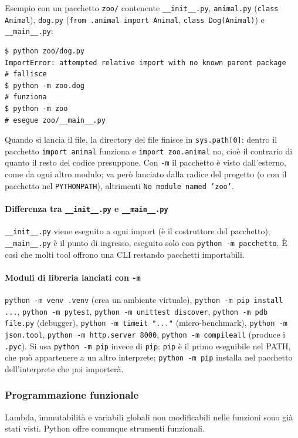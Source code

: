 \documentclass[a4paper,12pt]{article}
\begin{document}
Esempio con un pacchetto \texttt{zoo/} contenente \texttt{\_\_init\_\_.py}, \texttt{animal.py}
(\texttt{class Animal}), \texttt{dog.py} (\texttt{from .animal import Animal}, \texttt{class Dog(Animal)})
e \texttt{\_\_main\_\_.py}:
\begin{verbatim}
$ python zoo/dog.py
ImportError: attempted relative import with no known parent package   # fallisce
$ python -m zoo.dog                                                   # funziona
$ python -m zoo                                                       # esegue zoo/__main__.py
\end{verbatim}
Quando si lancia il file, la directory del file finisce in \texttt{sys.path[0]}: dentro il
pacchetto \texttt{import animal} funziona e \texttt{import zoo.animal} no, cioè il contrario
di quanto il resto del codice presuppone. Con \texttt{-m} il pacchetto è visto dall'esterno,
come da ogni altro modulo; va però lanciato dalla radice del progetto (o con il pacchetto nel
\texttt{PYTHONPATH}), altrimenti \texttt{No module named 'zoo'}.

\paragraph{Differenza tra \texttt{\_\_init\_\_.py} e \texttt{\_\_main\_\_.py}}
\texttt{\_\_init\_\_.py} viene eseguito a ogni import (è il costruttore del pacchetto);
\texttt{\_\_main\_\_.py} è il punto di ingresso, eseguito solo con \texttt{python -m pacchetto}.
È così che molti tool offrono una CLI restando pacchetti importabili.

\paragraph{Moduli di libreria lanciati con \texttt{-m}} \texttt{python -m venv .venv} (crea un
ambiente virtuale), \texttt{python -m pip install ...}, \texttt{python -m pytest},
\texttt{python -m unittest discover}, \texttt{python -m pdb file.py} (debugger),
\texttt{python -m timeit "..."} (micro-benchmark), \texttt{python -m json.tool},
\texttt{python -m http.server 8000}, \texttt{python -m compileall} (produce i \texttt{.pyc}).
Si usa \texttt{python -m pip} invece di \texttt{pip}: \texttt{pip} è il primo eseguibile nel
PATH, che può appartenere a un altro interprete; \texttt{python -m pip} installa nel
pacchetto dell'interprete che poi importerà.

\subsubsection{Programmazione funzionale}
Lambda, immutabilità e variabili globali non modificabili nelle funzioni sono già stati
visti. Python offre comunque strumenti funzionali.
\end{document}
